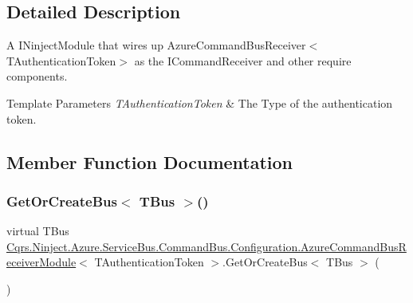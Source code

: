 \subsection{Detailed Description}
A I\+Ninject\+Module that wires up Azure\+Command\+Bus\+Receiver$<$\+T\+Authentication\+Token$>$ as the I\+Command\+Receiver and other require components. 


\begin{DoxyTemplParams}{Template Parameters}
{\em T\+Authentication\+Token} & The Type of the authentication token.\\
\hline
\end{DoxyTemplParams}


\subsection{Member Function Documentation}
\mbox{\label{classCqrs_1_1Ninject_1_1Azure_1_1ServiceBus_1_1CommandBus_1_1Configuration_1_1AzureCommandBusReceiverModule_a02ed26e1f091dc077449dbd3c76305f7_a02ed26e1f091dc077449dbd3c76305f7}} 
\subsubsection{\texorpdfstring{Get\+Or\+Create\+Bus$<$ T\+Bus $>$()}{GetOrCreateBus< TBus >()}}
{\footnotesize\ttfamily virtual T\+Bus \hyperlink{classCqrs_1_1Ninject_1_1Azure_1_1ServiceBus_1_1CommandBus_1_1Configuration_1_1AzureCommandBusReceiverModule}{Cqrs.\+Ninject.\+Azure.\+Service\+Bus.\+Command\+Bus.\+Configuration.\+Azure\+Command\+Bus\+Receiver\+Module}$<$ T\+Authentication\+Token $>$.Get\+Or\+Create\+Bus$<$ T\+Bus $>$ (\begin{DoxyParamCaption}{ }\end{DoxyParamCaption})\hspace{0.3cm}{\ttfamily [virtual]}}



